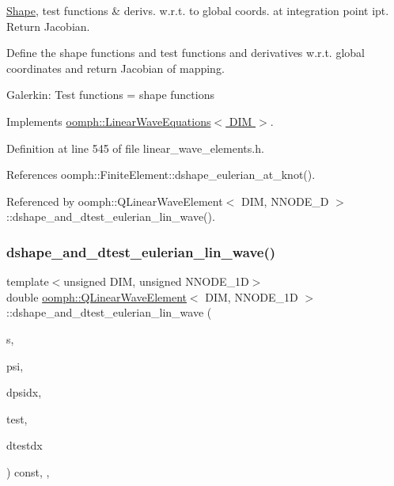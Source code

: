 \hyperlink{classoomph_1_1Shape}{Shape}, test functions \& derivs. w.\+r.\+t. to global coords. at integration point ipt. Return Jacobian. 

Define the shape functions and test functions and derivatives w.\+r.\+t. global coordinates and return Jacobian of mapping.

Galerkin\+: Test functions = shape functions 

Implements \hyperlink{classoomph_1_1LinearWaveEquations_a8033ffc13e61d7adcd4b7e1154ea12af}{oomph\+::\+Linear\+Wave\+Equations$<$ D\+I\+M $>$}.



Definition at line 545 of file linear\+\_\+wave\+\_\+elements.\+h.



References oomph\+::\+Finite\+Element\+::dshape\+\_\+eulerian\+\_\+at\+\_\+knot().



Referenced by oomph\+::\+Q\+Linear\+Wave\+Element$<$ D\+I\+M, N\+N\+O\+D\+E\+\_\+D $>$\+::dshape\+\_\+and\+\_\+dtest\+\_\+eulerian\+\_\+lin\+\_\+wave().

\mbox{\label{classoomph_1_1QLinearWaveElement_a97bfe7e067f0b8f3cf82b02ca1e7421e}} 
\subsubsection{\texorpdfstring{dshape\+\_\+and\+\_\+dtest\+\_\+eulerian\+\_\+lin\+\_\+wave()}{dshape\_and\_dtest\_eulerian\_lin\_wave()}}
{\footnotesize\ttfamily template$<$unsigned D\+IM, unsigned N\+N\+O\+D\+E\+\_\+1D$>$ \\
double \hyperlink{classoomph_1_1QLinearWaveElement}{oomph\+::\+Q\+Linear\+Wave\+Element}$<$ D\+IM, N\+N\+O\+D\+E\+\_\+1D $>$\+::dshape\+\_\+and\+\_\+dtest\+\_\+eulerian\+\_\+lin\+\_\+wave (\begin{DoxyParamCaption}\item[{const \hyperlink{classoomph_1_1Vector}{Vector}$<$ double $>$ \&}]{s,  }\item[{\hyperlink{classoomph_1_1Shape}{Shape} \&}]{psi,  }\item[{\hyperlink{classoomph_1_1DShape}{D\+Shape} \&}]{dpsidx,  }\item[{\hyperlink{classoomph_1_1Shape}{Shape} \&}]{test,  }\item[{\hyperlink{classoomph_1_1DShape}{D\+Shape} \&}]{dtestdx }\end{DoxyParamCaption}) const\hspace{0.3cm}{\ttfamily [inline]}, {\ttfamily [protected]}, {\ttfamily [virtual]}}



